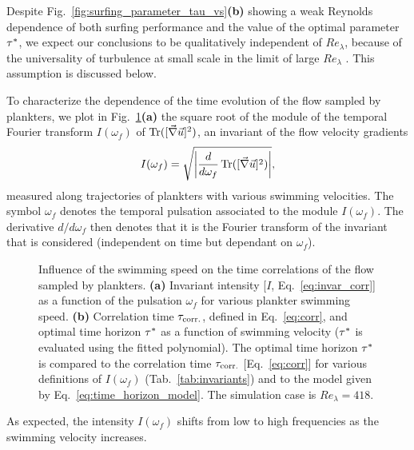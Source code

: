 Despite Fig.~\ref{fig:surfing_parameter_tau_vs}\textbf{(b)} showing a weak Reynolds dependence of both surfing performance and the value of the optimal parameter $\TimeHorizonOpt$, we expect our conclusions to be qualitatively independent of $\mathit{Re}_{\lambda}$, because of the universality of turbulence at small scale in the limit of large $\mathit{Re}_{\lambda}$ \citep{frisch1995turbulence}.
This assumption is discussed below.

To characterize the dependence of the time evolution of the flow sampled by plankters, we plot in Fig.~\ref{fig:surfing_correlation_time}\textbf{(a)} the square root of the module of the temporal Fourier transform $I(\omega_f)$ of $\tr([ \Gradients ]^2)$, an invariant of the flow velocity gradients
\begin{equation}\label{eq:invar_corr}
	I(\omega_f) = \sqrt{ \abs*{ \frac{d}{d\omega_f} \tr ( [ \Gradients ]^2 )} },
\end{equation}
measured along trajectories of plankters with various swimming velocities. 
The symbol $\omega_f$ denotes the temporal pulsation associated to the module $I(\omega_f)$.
The derivative $d/d\omega_f$ then denotes that it is the Fourier transform of the invariant that is considered (independent on time but dependant on $\omega_f$).
\begin{figure}%
	\centering
	
	\caption[Influence of the swimming speed on the time correlations of the flow sampled by plankters.]{
		Influence of the swimming speed on the time correlations of the flow sampled by plankters.
		\textbf{(a)} Invariant intensity [$I$, Eq.~\eqref{eq:invar_corr}] as a function of the pulsation $\omega_f$ for various plankter swimming speed. \textbf{(b)} Correlation time $\CorrelationTime$, defined in Eq.~\eqref{eq:corr}, and optimal time horizon $\TimeHorizonOpt$ as a function of swimming velocity ($\TimeHorizonOpt$ is evaluated using the fitted polynomial).
		The optimal time horizon $\TimeHorizonOpt$ is compared to the correlation time $\CorrelationTime$ [Eq.~\eqref{eq:corr}] for various definitions of $I(\omega_f)$ (Tab.~\ref{tab:invariants}) and to the model given by Eq.~\eqref{eq:time_horizon_model}.
		The simulation case is $\mathit{Re}_{\lambda} = 418$.
	}
	\label{fig:surfing_correlation_time}
\end{figure}
As expected, the intensity $I(\omega_f)$ shifts from low to high frequencies as the swimming velocity increases.

